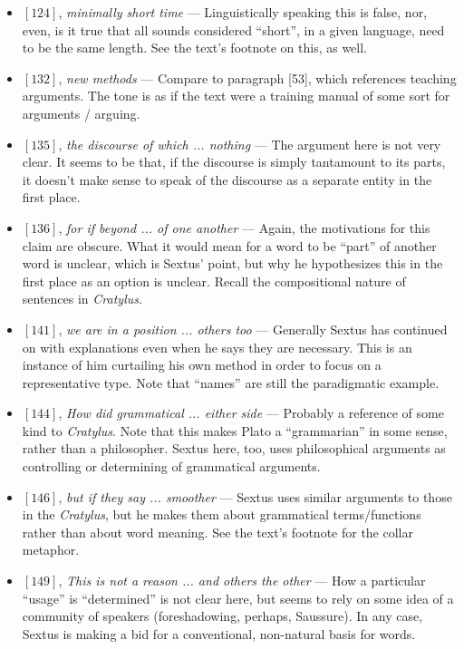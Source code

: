 \documentclass[12pt]{article}
\begin{document}
\begin{itemize}
\item $[124]$, \textit{minimally short time} --- Linguistically speaking this is false, nor, even, is it true that all sounds considered ``short'', in a given language, need to be the same length. See the text's footnote on this, as well.

\item $[132]$, \textit{new methods} --- Compare to paragraph [53], which references teaching arguments. The tone is as if the text were a training manual of some sort for arguments / arguing. 

\item $[135]$, \textit{the discourse of which ... nothing} --- The argument here is not very clear. It seems to be that, if the discourse is simply tantamount to its parts, it doesn't make sense to speak of the discourse as a separate entity in the first place.

\item $[136]$, \textit{for if beyond ... of one another} --- Again, the motivations for this claim are obscure. What it would mean for a word to be ``part'' of another word is unclear, which is Sextus' point, but why he hypothesizes this in the first place as an option is unclear. Recall the compositional nature of sentences in \textit{Cratylus}.

\item $[141]$, \textit{we are in a position ... others too} --- Generally Sextus has continued on with explanations even when he says they are necessary. This is an instance of him curtailing his own method in order to focus on a representative type. Note that ``names'' are still the paradigmatic example.

\item $[144]$, \textit{How did grammatical ... either side} --- Probably a reference of some kind to \textit{Cratylus}. Note that this makes Plato a ``grammarian'' in some sense, rather than a philosopher. Sextus here, too, uses philosophical arguments as controlling or determining of grammatical arguments.

\item $[146]$, \textit{but if they say ... smoother} --- Sextus uses similar arguments to those in the \textit{Cratylus}, but he makes them about grammatical terms/functions rather than about word meaning. See the text's footnote for the collar metaphor.

\item $[149]$, \textit{This is not a reason ... and others the other} --- How a particular ``usage'' is ``determined'' is not clear here, but seems to rely on some idea of a community of speakers (foreshadowing, perhaps, Saussure). In any case, Sextus is making a bid for a conventional, non-natural basis for words.


\end{itemize}
\end{document}
